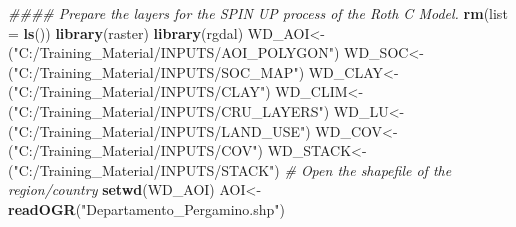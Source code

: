 \documentclass[
  10pt,
  b5paper,
]{book}
\newenvironment{Shaded}{\begin{snugshade}}{\end{snugshade}}
\newcommand{\CommentTok}[1]{\textcolor[rgb]{0.56,0.35,0.01}{\textit{#1}}}
\newcommand{\DataTypeTok}[1]{\textcolor[rgb]{0.13,0.29,0.53}{#1}}
\newcommand{\KeywordTok}[1]{\textcolor[rgb]{0.13,0.29,0.53}{\textbf{#1}}}
\newcommand{\NormalTok}[1]{#1}
\newcommand{\StringTok}[1]{\textcolor[rgb]{0.31,0.60,0.02}{#1}}
\begin{document}
\begin{Shaded}
\begin{Highlighting}[]
\CommentTok{#### Prepare the layers for the SPIN UP process of the Roth C Model. }
\KeywordTok{rm}\NormalTok{(}\DataTypeTok{list =} \KeywordTok{ls}\NormalTok{())}
\KeywordTok{library}\NormalTok{(raster)}
\KeywordTok{library}\NormalTok{(rgdal)}
\NormalTok{WD_AOI<-(}\StringTok{"C:/Training_Material/INPUTS/AOI_POLYGON"}\NormalTok{)}
\NormalTok{WD_SOC<-(}\StringTok{"C:/Training_Material/INPUTS/SOC_MAP"}\NormalTok{)}
\NormalTok{WD_CLAY<-(}\StringTok{"C:/Training_Material/INPUTS/CLAY"}\NormalTok{)}
\NormalTok{WD_CLIM<-(}\StringTok{"C:/Training_Material/INPUTS/CRU_LAYERS"}\NormalTok{)}
\NormalTok{WD_LU<-(}\StringTok{"C:/Training_Material/INPUTS/LAND_USE"}\NormalTok{)}
\NormalTok{WD_COV<-(}\StringTok{"C:/Training_Material/INPUTS/COV"}\NormalTok{)}
\NormalTok{WD_STACK<-(}\StringTok{"C:/Training_Material/INPUTS/STACK"}\NormalTok{)}
\CommentTok{# Open the shapefile of the region/country}
\KeywordTok{setwd}\NormalTok{(WD_AOI)}
\NormalTok{AOI<-}\KeywordTok{readOGR}\NormalTok{(}\StringTok{"Departamento_Pergamino.shp"}\NormalTok{)}


\end{Highlighting}
\end{Shaded}
\end{document}
